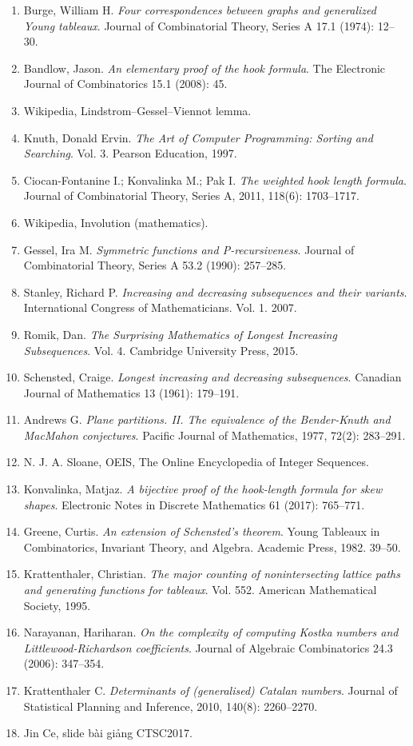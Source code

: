 \documentclass[11pt]{article}
\begin{document}
\begin{enumerate}
  \item Burge, William H. \emph{Four correspondences between graphs and
        generalized Young tableaux}. Journal of Combinatorial Theory, Series A
        17.1 (1974): 12--30.
  \item Bandlow, Jason. \emph{An elementary proof of the hook formula}. The
        Electronic Journal of Combinatorics 15.1 (2008): 45.
  \item Wikipedia, Lindstrom--Gessel--Viennot lemma.
  \item Knuth, Donald Ervin. \emph{The Art of Computer Programming: Sorting and
        Searching}. Vol. 3. Pearson Education, 1997.
  \item Ciocan-Fontanine I.; Konvalinka M.; Pak I. \emph{The weighted hook
        length formula}. Journal of Combinatorial Theory, Series A, 2011,
        118(6): 1703--1717.
  \item Wikipedia, Involution (mathematics).
  \item Gessel, Ira M. \emph{Symmetric functions and P-recursiveness}. Journal
        of Combinatorial Theory, Series A 53.2 (1990): 257--285.
  \item Stanley, Richard P. \emph{Increasing and decreasing subsequences and
        their variants}. International Congress of Mathematicians. Vol. 1.
        2007.
  \item Romik, Dan. \emph{The Surprising Mathematics of Longest Increasing
        Subsequences}. Vol. 4. Cambridge University Press, 2015.
  \item Schensted, Craige. \emph{Longest increasing and decreasing
        subsequences}. Canadian Journal of Mathematics 13 (1961): 179--191.
  \item Andrews G. \emph{Plane partitions. II. The equivalence of the
        Bender-Knuth and MacMahon conjectures}. Pacific Journal of Mathematics,
        1977, 72(2): 283--291.
  \item N. J. A. Sloane, OEIS, The Online Encyclopedia of Integer Sequences.
  \item Konvalinka, Matjaz. \emph{A bijective proof of the hook-length formula
        for skew shapes}. Electronic Notes in Discrete Mathematics 61 (2017):
        765--771.
  \item Greene, Curtis. \emph{An extension of Schensted's theorem}. Young
        Tableaux in Combinatorics, Invariant Theory, and Algebra. Academic
        Press, 1982. 39--50.
  \item Krattenthaler, Christian. \emph{The major counting of nonintersecting
        lattice paths and generating functions for tableaux}. Vol. 552.
        American Mathematical Society, 1995.
  \item Narayanan, Hariharan. \emph{On the complexity of computing Kostka
        numbers and Littlewood-Richardson coefficients}. Journal of Algebraic
        Combinatorics 24.3 (2006): 347--354.
  \item Krattenthaler C. \emph{Determinants of (generalised) Catalan numbers}.
        Journal of Statistical Planning and Inference, 2010, 140(8):
        2260--2270.
  \item Jin Ce, slide bài giảng CTSC2017.
\end{enumerate}
\end{document}
